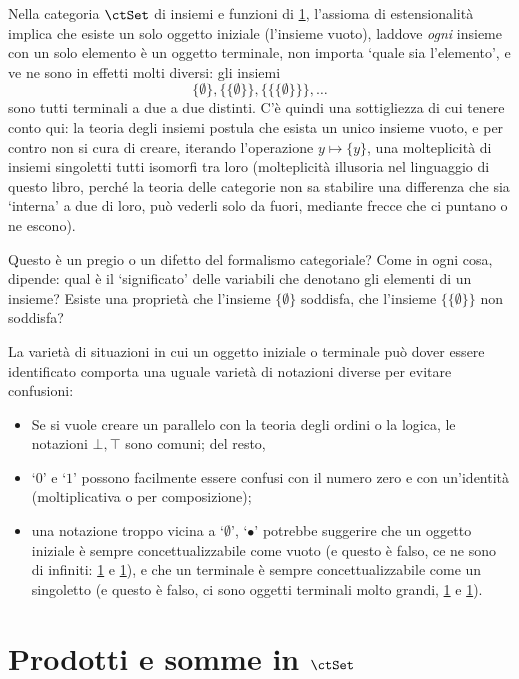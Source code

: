 \begin{example}
	Nella categoria \(\ctSet\) di insiemi e funzioni di \ref{}, l'assioma di estensionalità implica che esiste un solo oggetto iniziale (l'insieme vuoto), laddove \emph{ogni} insieme con un solo elemento è un oggetto terminale, non importa `quale sia l'elemento', e ve ne sono in effetti molti diversi: gli insiemi
	\[\{\emptyset\},\{\{\emptyset\}\},\{\{\{\emptyset\}\}\},\dots\]
	sono tutti terminali a due a due distinti. C'è quindi una sottigliezza di cui tenere conto qui: la teoria degli insiemi postula che esista un unico insieme vuoto, e per contro non si cura di creare, iterando l'operazione \(y\mapsto\{y\}\), una molteplicità di insiemi singoletti tutti isomorfi tra loro (molteplicità illusoria nel linguaggio di questo libro, perché la teoria delle categorie non sa stabilire una differenza che sia `interna' a due di loro, può vederli solo da fuori, mediante frecce che ci puntano o ne escono).

	Questo è un pregio o un difetto del formalismo categoriale? Come in ogni cosa, dipende: qual è il `significato' delle variabili che denotano gli elementi di un insieme? Esiste una proprietà che l'insieme \(\{\emptyset\}\) soddisfa, che l'insieme \(\{\{\emptyset\}\}\) non soddisfa?
\end{example}
\begin{remark}
	La varietà di situazioni in cui un oggetto iniziale o terminale può dover essere identificato comporta una uguale varietà di notazioni diverse per evitare confusioni:
	\begin{itemize}
		\item Se si vuole creare un parallelo con la teoria degli ordini o la logica, le notazioni \(\bot,\top\) sono comuni; del resto,
		\item `\(0\)' e `\(1\)' possono facilmente essere confusi con il numero zero e con un'identità (moltiplicativa o per composizione);
		\item una notazione troppo vicina a `\(\emptyset\)', `\(\bullet\)' potrebbe suggerire che un oggetto iniziale è sempre concettualizzabile come vuoto (e questo è falso, ce ne sono di infiniti: \ref{} e \ref{}), e che un terminale è sempre concettualizzabile come un singoletto (e questo è falso, ci sono oggetti terminali molto grandi, \ref{} e \ref{}).
	\end{itemize}
\end{remark}


\section{Prodotti e somme in \(\ctSet\)}

